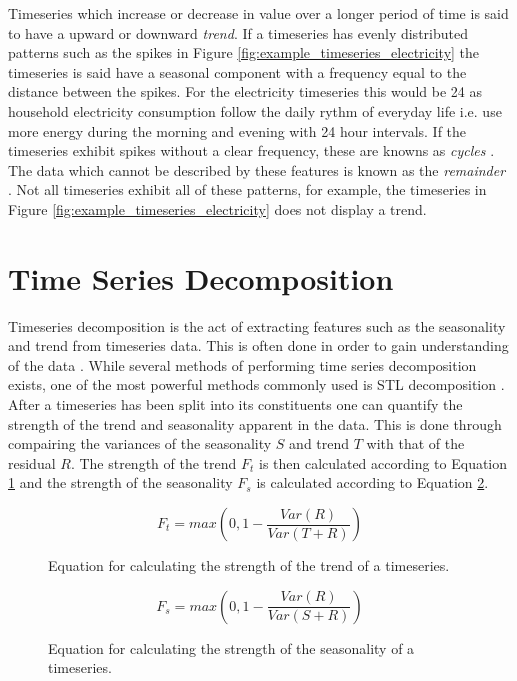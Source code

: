 Timeseries which increase or decrease in value over a longer period of time is said to have a upward or downward \textit{trend}. If a timeseries has evenly distributed patterns such as the spikes in Figure \ref{fig:example_timeseries_electricity} the timeseries is said have a seasonal component with a frequency equal to the distance between the spikes. For the electricity timeseries this would be 24 as household electricity consumption follow the daily rythm of everyday life i.e. use more energy during the morning and evening with 24 hour intervals. If the timeseries exhibit spikes without a clear frequency, these are knowns as \textit{cycles} \cite{bauer2021libra}. The data which cannot be described by these features is known as the \textit{remainder} \cite{hyndman_forecasting_3rd}. Not all timeseries exhibit all of these patterns, for example, the timeseries in Figure \ref{fig:example_timeseries_electricity} does not display a trend.

\section{Time Series Decomposition}
Timeseries decomposition is the act of extracting features such as the seasonality and trend from timeseries data. This is often done in order to gain understanding of the data \cite{hyndman_forecasting_3rd}. While several methods of performing time series decomposition exists, one of the most powerful methods commonly used is STL decomposition \cite{hyndman_forecasting_3rd}. After a timeseries has been split into its constituents one can quantify the strength of the trend and seasonality apparent in the data. This is done through compairing the variances of the seasonality \(S\) and trend \(T\) with that of the residual \(R\). The strength of the trend \(F_t\) is then calculated according to Equation \ref{eq:strength_of_trend} and the strength of the seasonality \(F_s\) is calculated according to Equation \ref{eq:strength_of_seasonality}.

\begin{figure}[h]
  \[ F_t = max(0,1-\frac{Var(R)}{Var(T + R)}) \]
  \caption{Equation for calculating the strength of the trend of a timeseries.}
  \label{eq:strength_of_trend}
\end{figure}

\begin{figure}[h]
  \[ F_s = max(0,1-\frac{Var(R)}{Var(S + R)}) \]
  \caption{Equation for calculating the strength of the seasonality of a timeseries.}
  \label{eq:strength_of_seasonality}
\end{figure}

